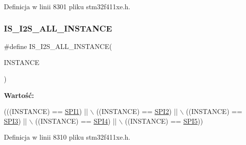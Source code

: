 Definicja w linii 8301 pliku stm32f411xe.\+h.

\mbox{\label{group___exported__macros_ga0b35685911e3c7a38ee89e5cdc5a82fa}} 
\subsubsection{\texorpdfstring{I\+S\+\_\+\+I2\+S\+\_\+\+A\+L\+L\+\_\+\+I\+N\+S\+T\+A\+N\+CE}{IS\_I2S\_ALL\_INSTANCE}}
{\footnotesize\ttfamily \#define I\+S\+\_\+\+I2\+S\+\_\+\+A\+L\+L\+\_\+\+I\+N\+S\+T\+A\+N\+CE(\begin{DoxyParamCaption}\item[{}]{I\+N\+S\+T\+A\+N\+CE }\end{DoxyParamCaption})}

{\bfseries Wartość\+:}
\begin{DoxyCode}
(((INSTANCE) == \hyperlink{group___peripheral__declaration_gad483be344a28ac800be8f03654a9612f}{SPI1}) || \(\backslash\)
                                        ((INSTANCE) == \hyperlink{group___peripheral__declaration_gaf2c3d8ce359dcfbb2261e07ed42af72b}{SPI2}) || \(\backslash\)
                                        ((INSTANCE) == \hyperlink{group___peripheral__declaration_gab2339cbf25502bf562b19208b1b257fc}{SPI3}) || \(\backslash\)
                                        ((INSTANCE) == \hyperlink{group___peripheral__declaration_ga2a2e6edef68cfe1946f39a5033da2301}{SPI4}) || \(\backslash\)
                                        ((INSTANCE) == \hyperlink{group___peripheral__declaration_ga5e676c061e19ced149b7c6de6b8985e5}{SPI5}))
\end{DoxyCode}


Definicja w linii 8310 pliku stm32f411xe.\+h.

\mbox{\label{group___exported__macros_ga839b019f23ec240da66dd50a21ab5025}} 
